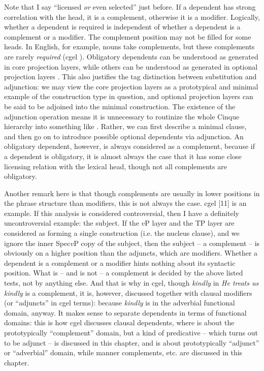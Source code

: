 \documentclass[../main.tex]{subfiles}
\begin{document}
Note that I say ``licensed \emph{or} even selected'' just before.
If a dependent has strong correlation with the head, it is a complement,
otherwise it is a modifier.
Logically, whether a dependent is required is independent of whether a dependent is a complement or a modifier.
The complement position may not be filled for some heads.
In English, for example, nouns take complements,
but these complements are rarely \emph{required} (\ac{cgel} ).
Obligatory dependents can be understood as generated in core projection layers,
while others can be understood as generated in optional projection layers \cite{pan2022deriving}.
This also justifies the \ac{tag} distinction between substitution and adjunction:
we may view the core projection layers as a prototypical and minimal example of the construction type in question,
and optional projection layers can be said to be adjoined into the minimal construction.
The existence of the adjunction operation means it is unnecessary
to routinize the whole Cinque hierarchy into something like .
Rather, we can first describe a minimal clause, 
and then go on to introduce possible optional dependents via adjunction. 
An obligatory dependent, however, is always considered as a complement, 
because if a dependent is obligatory, 
it is almost always the case that it has some close licensing relation with the lexical head,
though not all complements are obligatory.

Another remark here is that 
though complements are usually in lower positions in the phrase structure than modifiers,
this is not always the case.
\ac{cgel}  [11] is an example. 
If this analysis is considered controversial, 
then I have a definitely uncontroversial example: the subject.
If the $v$P layer and the TP layer are considered as forming a single construction (i.e. the nucleus clause),
and we ignore the inner Spec$v$P copy of the subject,
then the subject -- a complement -- is obviously on a higher position than the adjuncts, which are modifiers.
Whether a dependent is a complement or a modifier hints nothing about its syntactic position. 
What is -- and is not -- a complement is decided by the above listed tests, 
not by anything else.
And that is why in \ac{cgel}, though \emph{kindly} in \emph{He treats us kindly} is a complement,
it is, however, discussed together with clausal modifiers (or ``adjuncts'' in \ac{cgel} terms):
because \emph{kindly} is in the adverbial functional domain, anyway.
It makes sense to separate dependents in terms of functional domains:
this is how \ac{cgel} discusses clausal dependents, 
where  is about the prototypically ``complement'' domain,
but a kind of predicative -- which turns out to be adjunct -- 
is discussed in this chapter, 
and  is about prototypically ``adjunct'' or ``adverbial'' domain,
while manner complements, etc. are discussed in this chapter.
\end{document}
